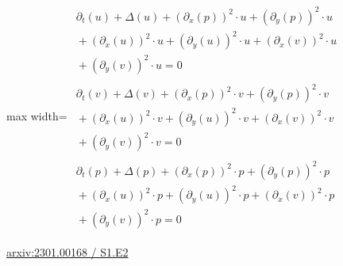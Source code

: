 \documentclass[UTF8,10pt,a4paper,fontset=mac]{ctexart}
\begin{document}
\begin{minipage}{\linewidth}\begin{center}\begin{adjustbox}{max width=\linewidth}$\displaystyle\begin{gathered}\begin{gathered}\partial_{t}(u)+\Delta(u)+(\partial_{x}(p))^{2}\cdot u+(\partial_{y}(p))^{2}\cdot u\\[-1pt]{}+(\partial_{x}(u))^{2}\cdot u+(\partial_{y}(u))^{2}\cdot u+(\partial_{x}(v))^{2}\cdot u\\[-1pt]{}+(\partial_{y}(v))^{2}\cdot u=0\end{gathered}\\[5pt]\begin{gathered}\partial_{t}(v)+\Delta(v)+(\partial_{x}(p))^{2}\cdot v+(\partial_{y}(p))^{2}\cdot v\\[-1pt]{}+(\partial_{x}(u))^{2}\cdot v+(\partial_{y}(u))^{2}\cdot v+(\partial_{x}(v))^{2}\cdot v\\[-1pt]{}+(\partial_{y}(v))^{2}\cdot v=0\end{gathered}\\[5pt]\begin{gathered}\partial_{t}(p)+\Delta(p)+(\partial_{x}(p))^{2}\cdot p+(\partial_{y}(p))^{2}\cdot p\\[-1pt]{}+(\partial_{x}(u))^{2}\cdot p+(\partial_{y}(u))^{2}\cdot p+(\partial_{x}(v))^{2}\cdot p\\[-1pt]{}+(\partial_{y}(v))^{2}\cdot p=0\end{gathered}\end{gathered}$\end{adjustbox}\end{center}{\small\href{https://arxiv.org/html/2301.00168#S1.E2}{arxiv:2301.00168 / S1.E2}}\par\end{minipage}\par\vspace{6mm}
\end{document}
